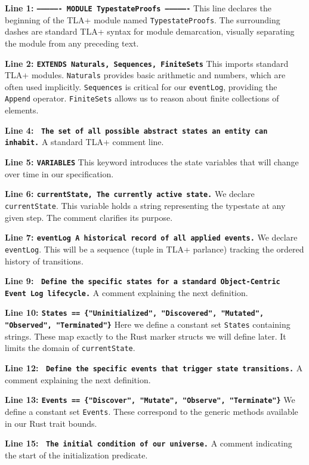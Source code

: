 \textbf{Line 1: \texttt{---------------- MODULE TypestateProofs ----------------}}
This line declares the beginning of the TLA+ module named \texttt{TypestateProofs}. The surrounding dashes are standard TLA+ syntax for module demarcation, visually separating the module from any preceding text.

\textbf{Line 2: \texttt{EXTENDS Naturals, Sequences, FiniteSets}}
This imports standard TLA+ modules. \texttt{Naturals} provides basic arithmetic and numbers, which are often used implicitly. \texttt{Sequences} is critical for our \texttt{eventLog}, providing the \texttt{Append} operator. \texttt{FiniteSets} allows us to reason about finite collections of elements.

\textbf{Line 4: \texttt{\* The set of all possible abstract states an entity can inhabit.}}
A standard TLA+ comment line.

\textbf{Line 5: \texttt{VARIABLES}}
This keyword introduces the state variables that will change over time in our specification.

\textbf{Line 6: \texttt{currentState,  \* The currently active state.}}
We declare \texttt{currentState}. This variable holds a string representing the typestate at any given step. The comment clarifies its purpose.

\textbf{Line 7: \texttt{eventLog       \* A historical record of all applied events.}}
We declare \texttt{eventLog}. This will be a sequence (tuple in TLA+ parlance) tracking the ordered history of transitions.

\textbf{Line 9: \texttt{\* Define the specific states for a standard Object-Centric Event Log lifecycle.}}
A comment explaining the next definition.

\textbf{Line 10: \texttt{States == \{"Uninitialized", "Discovered", "Mutated", "Observed", "Terminated"\}}}
Here we define a constant set \texttt{States} containing strings. These map exactly to the Rust marker structs we will define later. It limits the domain of \texttt{currentState}.

\textbf{Line 12: \texttt{\* Define the specific events that trigger state transitions.}}
A comment explaining the next definition.

\textbf{Line 13: \texttt{Events == \{"Discover", "Mutate", "Observe", "Terminate"\}}}
We define a constant set \texttt{Events}. These correspond to the generic methods available in our Rust trait bounds.

\textbf{Line 15: \texttt{\* The initial condition of our universe.}}
A comment indicating the start of the initialization predicate.

